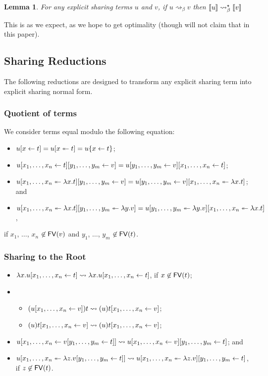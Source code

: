 \documentclass[11pt,a4paper]{article}
\theoremstyle{definition}
\theoremstyle{plain}
\newtheorem{lemma}[definition]{Lemma}
\theoremstyle{remark}
\begin{document}
\begin{lemma}
For any explicit sharing terms $u$ and $v$, if $u\rightsquigarrow_\beta v$ then ${\llbracket{u}\rrbracket}\rightsquigarrow^\star_\beta{\llbracket{v}\rrbracket}$
\end{lemma}

This is as we expect, as we hope to get optimality (though will not claim that in this paper).

\subsection{Sharing Reductions}

The following reductions are designed to transform any explicit sharing term into explicit sharing normal form.

\subsubsection{Quotient of terms}

We consider terms equal modulo the following equation:

\begin{itemize}
 \item ${ {u}[{x}\leftarrow{t}] }={ {u}[{x}\twoheadleftarrow{t}] }=u\{x\leftarrow t\}$;
 \item ${ { {{ { {u}[{{x_1},\dots,{x_n}}\leftarrow{t}] } }}[{{y_1},\dots,{y_m}}\leftarrow{v}] } }={ { {{ { {u}[{{y_1},\dots,{y_m}}\leftarrow{v}] } }}[{{x_1},\dots,{x_n}}\leftarrow{t}] } }$;
 \item ${ { {{ { {u}[{{x_1},\dots,{x_n}}\twoheadleftarrow{\lambda{x}.{t}}] } }}[{{y_1},\dots,{y_m}}\leftarrow{v}] } }={ { {{ { {u}[{{y_1},\dots,{y_m}}\leftarrow{v}] } }}[{{x_1},\dots,{x_n}}\twoheadleftarrow{\lambda{x}.{t}}] } }$; and
 \item ${ { {{ { {u}[{{x_1},\dots,{x_n}}\twoheadleftarrow{\lambda{x}.{t}}] } }}[{{y_1},\dots,{y_m}}\twoheadleftarrow{\lambda{y}.{v}}] } }={ { {{ { {u}[{{y_1},\dots,{y_m}}\twoheadleftarrow{\lambda{y}.{v}}] } }}[{{x_1},\dots,{x_n}}\twoheadleftarrow{\lambda{x}.{t}}] } }$,
\end{itemize}
if $x_1$, $\dots$, $x_n$ $\not\in{\mathop{\mathsf{FV}}}(v)$ and $y_1$, $\dots$, $y_m$ $\not\in{\mathop{\mathsf{FV}}}(t)$.

\subsubsection{Sharing to the Root}

\begin{itemize}
 \item $\lambda x.{ { {u}[{{x_1},\dots,{x_n}}\leftarrow{t}] } }\rightsquigarrow{  { {\lambda x.u}[{{x_1},\dots,{x_n}}\leftarrow{t}] }  }$, if $x\not\in{\mathop{\mathsf{FV}}}(t)$;
 \item \begin{itemize}
        \item $({ { {u}[{{x_1},\dots,{x_n}}\leftarrow{v}] } })t\rightsquigarrow{  { {(u)t}[{{x_1},\dots,{x_n}}\leftarrow{v}] }  }$;
        \item $(u){ { {t}[{{x_1},\dots,{x_n}}\leftarrow{v}] } }\rightsquigarrow{  { {(u)t}[{{x_1},\dots,{x_n}}\leftarrow{v}] }  }$;
       \end{itemize}
 \item ${ { {u}[{{x_1},\dots,{x_n}}\leftarrow{ {  { {v}[{{y_1},\dots,{y_m}}\leftarrow{t}] }  } }] } }\rightsquigarrow{  { { {  { {u}[{{x_1},\dots,{x_n}}\leftarrow{v}] }  } }[{{y_1},\dots,{y_m}}\leftarrow{t}] }  }$; and
 \item ${ { {u}[{{x_1},\dots,{x_n}}\twoheadleftarrow{\lambda{z}.{ {  { {v}[{{y_1},\dots,{y_m}}\leftarrow{t}] }  } }}] } }\rightsquigarrow{  { { {  { {u}[{{x_1},\dots,{x_n}}\twoheadleftarrow{\lambda{z}.{v}}] }  } }[{{y_1},\dots,{y_m}}\leftarrow{t}] }  }$, if $z\not\in{\mathop{\mathsf{FV}}}(t)$.
\end{itemize}
\end{document}

